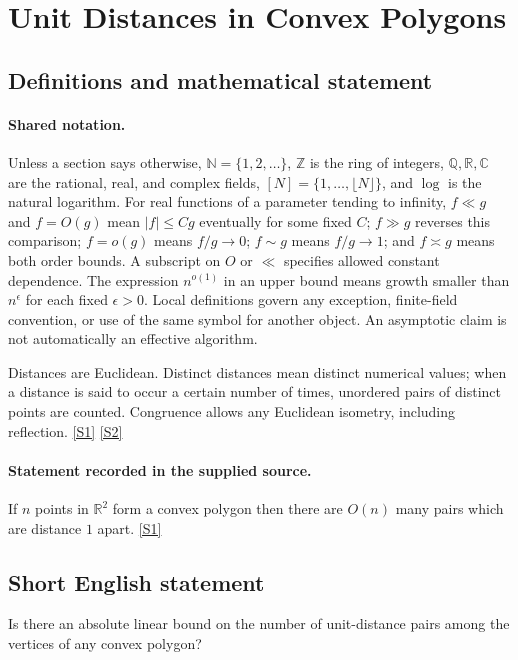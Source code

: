 \documentclass[11pt,a4paper]{article}
\newcommand{\N}{\mathbb{N}}
\newcommand{\Z}{\mathbb{Z}}
\newcommand{\Q}{\mathbb{Q}}
\newcommand{\R}{\mathbb{R}}
\newcommand{\C}{\mathbb{C}}
\newcommand{\sref}[2]{\hyperlink{source:#1:#2}{[S#2]}}
\begin{document}
\section{Unit Distances in Convex Polygons}\label{statement}


\subsection{Definitions and mathematical statement}

\paragraph{Shared notation.}Unless a section says otherwise, $\N=\{1,2,\ldots\}$,
$\Z$ is the ring of integers, $\Q,\R,\C$ are the rational, real, and complex
fields, $[N]=\{1,\ldots,\lfloor N\rfloor\}$, and $\log$ is the natural
logarithm. For real functions of a parameter tending to infinity,
$f\ll g$ and $f=O(g)$ mean $|f|\leq Cg$ eventually for some fixed $C$;
$f\gg g$ reverses this comparison; $f=o(g)$ means $f/g\to0$;
$f\sim g$ means $f/g\to1$; and $f\asymp g$ means both order bounds.
A subscript on $O$ or $\ll$ specifies allowed constant dependence.
The expression $n^{o(1)}$ in an upper bound means growth smaller than
$n^\epsilon$ for each fixed $\epsilon>0$. Local definitions govern any
exception, finite-field convention, or use of the same symbol for another
object. An asymptotic claim is not automatically an effective algorithm.



Distances are Euclidean. Distinct distances mean distinct numerical values; when a distance is said to occur a certain number of times, unordered pairs of distinct points are counted. Congruence allows any Euclidean isometry, including reflection. \sref{statement}{1} \sref{statement}{2}

\paragraph{Statement recorded in the supplied source.}
If $n$ points in $\mathbb{R}^2$ form a convex polygon then there are $O(n)$ many pairs which are distance $1$ apart. \sref{statement}{1}

\subsection{Short English statement}

Is there an absolute linear bound on the number of unit-distance pairs among the vertices of any convex polygon?
\end{document}

